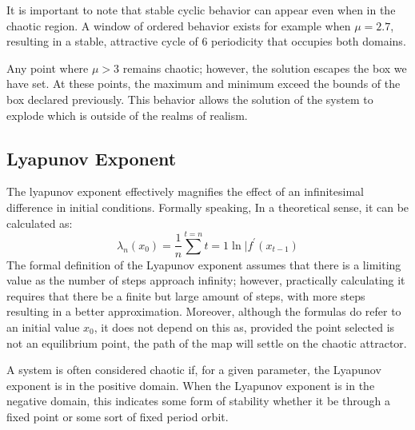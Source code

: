 \documentclass[]{article}
\begin{document}
		It is important to note that stable cyclic behavior can appear even when in the chaotic region. A window of ordered behavior exists for example when $\mu=2.7$, resulting in a stable, attractive cycle of 6 periodicity that occupies both domains.

		Any point where $\mu>3$ remains chaotic; however, the solution escapes the box we have set. At these points, the maximum and minimum exceed the bounds of the box declared previously. This behavior allows the solution of the system to explode which is outside of the realms of realism.
	\subsection*{Lyapunov Exponent}
		The lyapunov exponent effectively magnifies the effect of an infinitesimal difference in initial conditions. Formally speaking, In a theoretical sense, it can be calculated as:
		\begin{equation}
			\lambda_n(x_0)=\frac{1}{n}\sum^{t=n}{t=1}\ln|f^\prime(x_{t-1})
		\end{equation}
		The formal definition of the Lyapunov exponent assumes that there is a limiting value as the number of steps approach infinity; however, practically calculating it requires that there be a finite but large amount of steps, with more steps resulting in a better approximation. Moreover, although the formulas do refer to an initial value $x_0$, it does not depend on this as, provided the point selected is not an equilibrium point, the path of the map will settle on the chaotic attractor.

		A system is often considered chaotic if, for a given parameter, the Lyapunov exponent is in the positive domain. When the Lyapunov exponent is in the negative domain, this indicates some form of stability whether it be through a fixed point or some sort of fixed period orbit.

		
\end{document}
